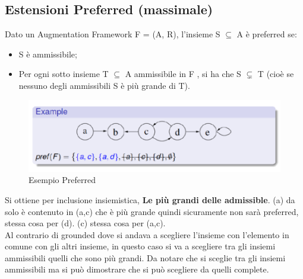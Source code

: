 \subsection{Estensioni Preferred (massimale)}
Dato un Augmentation Framework F = (A, R), l'insieme S $\subseteq$ A è preferred
se:
\begin{itemize}
    \item S è ammissibile;
    \item Per ogni sotto insieme T $\subseteq$ A ammissibile in F , si ha che S
          $\subsetneq$ T (cioè se nessuno degli ammissibili S è più grande di T).
\end{itemize}
\begin{figure}[htp]
    \centering
    \includegraphics[width=12cm, keepaspectratio]{img/Cap6/prefered.png}
    \caption{Esempio Preferred}
\end{figure}
Si ottiene per inclusione insiemistica, \textbf{Le più grandi delle admissible}.
(a) da solo è contenuto in (a,c) che è più grande quindi sicuramente non sarà
preferred, stessa cosa per (d). (c) stessa cosa per (a,c). \\Al contrario di
grounded dove si andava a scegliere l'insieme con l'elemento in comune con gli
altri insieme, in questo caso si va a scegliere tra gli insiemi ammissibili
quelli che sono più grandi. Da notare che si sceglie tra gli insiemi ammissibili
ma si può dimostrare che si può scegliere da quelli complete.

